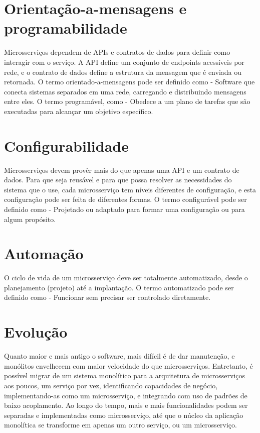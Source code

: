 \section{Orientação-a-mensagens e programabilidade}

Microsserviços dependem de APIs e contratos de dados para definir como interagir com o serviço. A API define um conjunto de endpoints acessíveis por rede, e o contrato de dados define a estrutura da mensagem que é enviada ou retornada. O termo orientado-a-mensagens pode ser definido como - Software que conecta sistemas separados em uma rede, carregando e distribuindo mensagens entre eles. O termo programável, como - Obedece a um plano de tarefas que são executadas para alcançar um objetivo específico. \cite{Familiar2015}

\section{Configurabilidade}

Microsserviços devem provêr mais do que apenas uma API e um contrato de dados. Para que seja reusável e para que possa resolver as necessidades do sistema que o use, cada microsserviço tem níveis diferentes de configuração, e esta configuração pode ser feita de diferentes formas. O termo configurável pode ser definido como - Projetado ou adaptado para formar uma configuração ou para algum propósito. \cite{Familiar2015}

\section {Automação}

O ciclo de vida de um microsserviço deve ser totalmente automatizado, desde o planejamento (projeto) até a implantação. O termo automatizado pode ser definido como - Funcionar sem precisar ser controlado diretamente. \cite{Familiar2015}


\section{Evolução}

Quanto maior e mais antigo o software, mais difícil é de dar manutenção, e monólitos envelhecem com maior velocidade do que microsserviços. Entretanto, é possível migrar de um sistema monolítico para a arquitetura de microsserviços aos poucos, um serviço por vez, identificando capacidades de negócio, implementando-as como um microsserviço, e integrando com uso de padrões de baixo acoplamento. Ao longo do tempo, mais e mais funcionalidades podem ser separadas e implementadas como microsserviço, até que o núcleo da aplicação monolítica se transforme em apenas um outro serviço, ou um microsserviço. \cite{Familiar2015}

